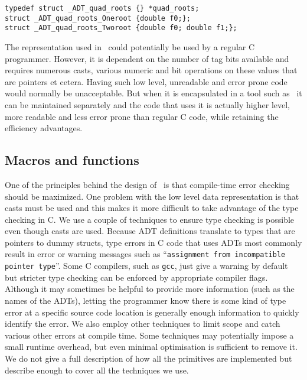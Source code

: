 

\begin{verbatim}
typedef struct _ADT_quad_roots {} *quad_roots;
struct _ADT_quad_roots_Oneroot {double f0;};
struct _ADT_quad_roots_Tworoot {double f0; double f1;};
\end{verbatim}

The representation used
in \adtpp\ could potentially be used by a regular C programmer.
However, it is dependent on the number of tag bits available and requires
numerous casts, various numeric and bit operations on these values that
are pointers et cetera.  Having such low level, unreadable and error
prone code would normally be unacceptable.  But when it is encapsulated
in a tool such as \adtpp\ it can be maintained separately and the
code that uses it is actually higher level, more readable and less error
prone than regular C code, while retaining the efficiency advantages.

\subsection{Macros and functions}
\label{sec-macros}

One of the principles behind the design of \adtpp\ is that
compile-time error checking should be maximized.  One problem with the
low level data representation is that casts must be used and this makes
it more difficult to take advantage of the type checking in C.  We use
a couple of techniques to ensure type checking is possible even though
casts are used. Because ADT definitions translate to types that are
pointers to dummy structs, type errors in C code that uses ADTs most
commonly result in error or warning messages such as ``\texttt{assignment
from incompatible pointer type}''.  Some C compilers, such as
\texttt{gcc}, just give a warning by default but stricter type checking
can be enforced by appropriate compiler flags. Although it may sometimes
be helpful to provide more information (such as the names of the ADTs),
letting the programmer know there is some kind of type error at a
specific source code location is generally enough information to quickly
identify the error.
We also employ other techniques to limit scope and catch various other
errors at compile time.  Some techniques may potentially impose a
small runtime overhead, but even minimal optimisation is sufficient to
remove it.  We do not give a full description of how all the primitives
are implemented but describe enough to cover all the techniques we use.

